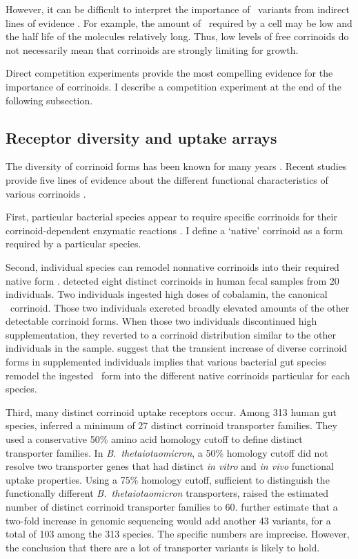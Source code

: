 \documentclass[\mydocfontsize]{article}
\begin{document}
\begin{multicols}{2}
However, it can be difficult to interpret the importance of \bt\ variants from indirect lines of evidence \autocite{droop07vitamins}. For example, the amount of \bt\ required by a cell may be low and the half life of the molecules relatively long. Thus, low levels of free corrinoids do not necessarily mean that corrinoids are strongly limiting for growth. 

Direct competition experiments provide the most compelling evidence for the importance of corrinoids. I describe a competition experiment at the end of the following subsection.

\subsection{Receptor diversity and uptake arrays}

The diversity of corrinoid forms has been known for many years \autocite{roth96cobalamin}. Recent studies provide five lines of evidence about the different functional characteristics of various corrinoids \autocite{degnan14vitamin}.

First, particular bacterial species appear to require specific corrinoids for their corrinoid-dependent enzymatic reactions \autocite{yi12versatility,mok13growth,keller14exogenous}. I define a `native' corrinoid as a form required by a particular species.

Second, individual species can remodel nonnative corrinoids into their required native form \autocite{gray09the-cobinamide,yi12versatility}. \textcite{allen08identification} detected eight distinct corrinoids in human fecal samples from 20 individuals. Two individuals ingested high doses of cobalamin, the canonical \bt\ corrinoid. Those two individuals excreted broadly elevated amounts of the other detectable corrinoid forms. When those two individuals discontinued high supplementation, they reverted to a corrinoid distribution similar to the other individuals in the sample. \textcite{degnan14vitamin} suggest that the transient increase of diverse corrinoid forms in supplemented individuals implies that various bacterial gut species remodel the ingested \bt\ form into the different native corrinoids particular for each species. 

Third, many distinct corrinoid uptake receptors occur. Among 313 human gut species, \textcite{degnan14human} inferred a minimum of 27 distinct corrinoid transporter families. They used a conservative 50\% amino acid homology cutoff to define distinct transporter families. In \textit{B.\ thetaiotaomicron}, a 50\% homology cutoff did not resolve two transporter genes that had distinct \textit{in vitro} and \textit{in vivo} functional uptake properties. Using a 75\% homology cutoff, sufficient to distinguish the functionally different \textit{B.\ thetaiotaomicron} transporters, raised the estimated number of distinct corrinoid transporter families to 60. \textcite{degnan14human} further estimate that a two-fold increase in genomic sequencing would add another 43 variants, for a total of 103 among the 313 species. The specific numbers are imprecise. However, the conclusion that there are a lot of transporter variants is likely to hold.


\end{multicols}
\end{document}
